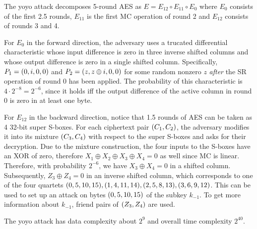 \documentclass[twoside]{article}
\begin{document}
The yoyo attack decomposes 5-round AES as \(E = E_{12} \circ E_{11} \circ E_0\)
where \(E_0\) consists of the first 2.5 rounds, \(E_{11}\) is the first MC
operation of round 2 and \(E_{12}\) consists of rounds 3 and 4. 

For \(E_0\) in the forward direction, the adversary uses a trucated differential
characteristic whose input difference is zero in three inverse shifted columns
and whose output difference is zero in a single shifted column. Specifically,
\(P_1 = (0, i, 0, 0)\) and \(P_2 = (z, z \oplus i, 0, 0)\) for some
random nonzero \(z\) \emph{after} the SR operation of round 0 has been applied.
The probability of this characteristic is \(4 \cdot 2^{-8} = 2^{-6}\), since it
holds iff the output difference of the active column in round 0 is zero in at
least one byte.

For \(E_{12}\) in the backward direction, notice that 1.5 rounds of AES can be
taken as 4 32-bit super S-boxes. For each ciphertext pair \((C_1, C_2)\),
the adversary modifies it into its mixture \((C_3, C_4)\) with respect to
the super S-boxes and asks for their decryption. Due to the mixture
construction, the four inputs to the S-boxes have an XOR of zero, therefore
\(X_1 \oplus X_2 \oplus X_3 \oplus X_4 = 0\) as well since MC is linear.
Therefore, with probability \(2^{-6}\), we have \(X_3 \oplus X_4 = 0\) in a
shifted column. Subsequently, \(Z_3 \oplus Z_4 = 0\) in an inverse shifted
column, which corresponds to one of the four quartets \((0,5,10,15),
(1,4,11,14), (2,5,8,13), (3,6,9,12)\). This can be used to set up
an attack on bytes \((0,5,10,15)\) of the subkey \(k_{-1}\). To get more
information about \(k_{-1}\), friend pairs of \((Z_3, Z_4)\) are used.

The yoyo attack has data complexity about \(2^9\) and overall time complexity
\(2^{40}\).
\end{document}
